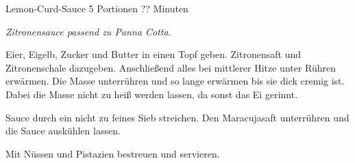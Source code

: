 \begin{recipe}{Lemon-Curd-Sauce} {5 Portionen} {?? Minuten}

  \freeform
  \textit{Zitronensauce passend zu Panna Cotta.}


  Eier, Eigelb, Zucker und Butter in einen Topf geben.
  Zitronensaft und Zitronenschale dazugeben.
  Anschließend alles bei mittlerer Hitze unter Rühren erwärmen.
  Die Masse unterrühren und so lange erwärmen bis sie dick cremig ist.
  Dabei die Masse nicht zu heiß werden lassen, da sonst das Ei gerinnt.

  \newstep
  Sauce durch ein nicht zu feines Sieb streichen.
  Den Maracujasaft unterrühren und die Sauce auskühlen lassen.

  \newstep
  Mit Nüssen und Pistazien bestreuen und servieren.

  \freeform
  \hrulefill

\end{recipe}
